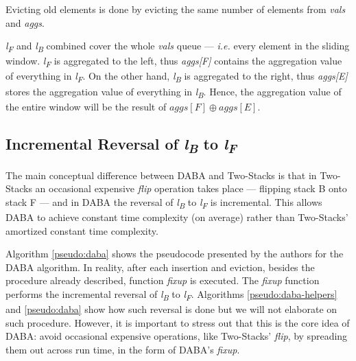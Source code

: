 Evicting old elements is done by evicting the same number of elements from \textit{vals} and \textit{aggs}.

\textit{l\textsubscript{F}} and \textit{l\textsubscript{B}} combined cover the whole \textit{vals} queue --- \textit{i.e.} every element in the sliding window. \textit{l\textsubscript{F}} is aggregated to the left, thus \textit{aggs[F]} contains the aggregation value of everything in \textit{l\textsubscript{F}}. On the other hand, \textit{l\textsubscript{B}} is aggregated to the right, thus \textit{aggs[E]} stores the aggregation value of everything in \textit{l\textsubscript{B}}. Hence, the aggregation value of the entire window will be the result of \textit{$aggs[F] \oplus aggs[E]$}.


\subsection*{Incremental Reversal of \textit{l\textsubscript{B}} to \textit{l\textsubscript{F}}}

The main conceptual difference between DABA and Two-Stacks is that in Two-Stacks an occasional expensive \textit{flip} operation takes place --- flipping stack B onto stack F --- and in DABA the reversal of \textit{l\textsubscript{B}} to \textit{l\textsubscript{F}} is incremental. This allows DABA to achieve constant time complexity (on average) rather than Two-Stacks' amortized constant time complexity.

Algorithm \ref{pseudo:daba} shows the pseudocode presented by the authors for the DABA algorithm. In reality, after each insertion and eviction, besides the procedure already described, function \textit{fixup} is executed. The \textit{fixup} function performs the incremental reversal of \textit{l\textsubscript{B}} to \textit{l\textsubscript{F}}. Algorithms \ref{pseudo:daba-helpers} and \ref{pseudo:daba} show how such reversal is done but we will not elaborate on such procedure. However, it is important to stress out that this is the core idea of DABA: avoid occasional expensive operations, like Two-Stacks' \textit{flip}, by spreading them out across run time, in the form of DABA's \textit{fixup}.

